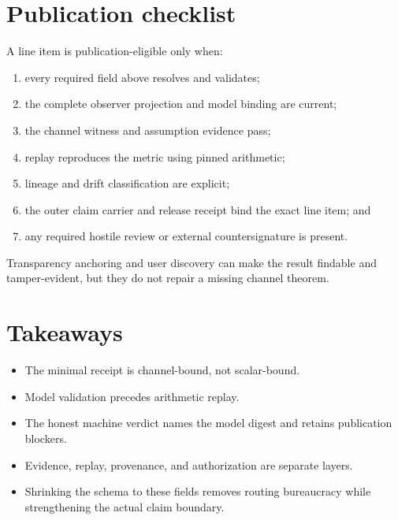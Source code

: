 \documentclass[11pt]{article}
\begin{document}
\section{Publication checklist}\label{sec:publish}
A line item is publication-eligible only when:
\begin{enumerate}[leftmargin=*]
\item every required field above resolves and validates;
\item the complete observer projection and model binding are current;
\item the channel witness and assumption evidence pass;
\item replay reproduces the metric using pinned arithmetic;
\item lineage and drift classification are explicit;
\item the outer claim carrier and release receipt bind the exact line item; and
\item any required hostile review or external countersignature is present.
\end{enumerate}
Transparency anchoring and user discovery can make the result findable and tamper-evident, but they do not repair a missing channel theorem.\cite{series:abomoinl,series:releaseproperty,series:transparencyprimitives,series:userminiface}

\section{Takeaways}
\begin{itemize}[leftmargin=*]
\item The minimal receipt is channel-bound, not scalar-bound.
\item Model validation precedes arithmetic replay.
\item The honest machine verdict names the model digest and retains publication blockers.
\item Evidence, replay, provenance, and authorization are separate layers.
\item Shrinking the schema to these fields removes routing bureaucracy while strengthening the actual claim boundary.
\end{itemize}
\end{document}
